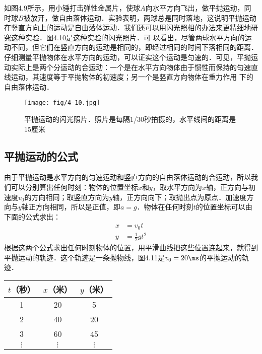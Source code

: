 如图4.9所示，用小锤打击弹性金属片，使球$A$向水平方向飞出，做平抛运动，同时球$B$被放开，做自由落体运动．实验表明，两球总是同时落地，这说明平抛运动在竖直方向上的运动是自由落体运动．我们还可以用闪光照相的办法来更精细地研究这种实验．图4.10是这种实验的闪光照片．可
以看出，尽管两球水平方向的运动不同，但它们在竖直方向的运动是相同的，即经过相同的时间下落相同的距离．仔细测量平抛物体在水平方向的运动，可以证实这个运动是匀速的．可见，平抛运动实际上是两个分运动的合运动：一个是在水平方向物体由于惯性而保持的匀速直线运动，其速度等于平抛物体的初速度；另一个是竖直方向物体在重力作用
下的自由落体运动．

\begin{figure}[htp]
    \centering
    \texttt{[image: fig/4-10.jpg]}
    \caption{平抛运动的闪光照片．照片是每隔1/30秒拍摄的，水平线间的距离是15厘米
}
    \end{figure}

\subsection{平抛运动的公式} 

由于平抛运动是水平方向的匀速运动和竖直方向的自由落体运动的合运动，所以我们可以分别算出任何时刻：物体的位置坐标$x$和$y$，取水平方向为$x$轴，正方向与初速度$v_0$的方向相同；取竖直方向为$y$轴，正方向向下；取抛出点为原点．加速度方向与$y$轴正方向相同，所以是正值，即$a=g$．物体在任何时刻$t$的位置坐标可以由下面的公式求出：
\[\begin{split}
x&=v_0 t\\
y&=\frac{1}{2}gt^2
\end{split} \]
根据这两个公式求出任何时刻物体的位置，用平滑曲线把这些位置连起来，就得到平抛运动的轨迹．这个轨迹是一条抛物线，图4.11是$v_0=20\ms$的平抛运动的轨迹．

\begin{center}
\begin{tabular}{ccc}
\hline
$t$（秒）   &  $x$（米）   &  $y$（米）\\
\hline
1 & 20 & 5\\
2 & 40 & 20\\
3 & 60 & 45\\
$\vdots$ & $\vdots$ & $\vdots$\\
\hline
\end{tabular}
\end{center}

